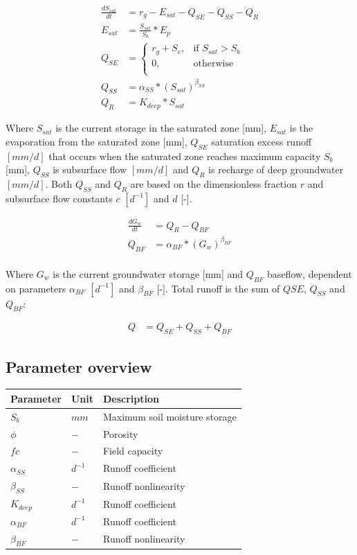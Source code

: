 \begin{align}
	\frac{dS_{sat}}{dt} &= r_g - E_{sat} - Q_{SE} - Q_{SS} - Q_{R}\\
	E_{sat} &= \frac{S_{sat}}{S_b}*E_p\\
	Q_{SE} &= \begin{cases}
		r_g+S_e, &\text{if } S_{sat} > S_b \\
		0, & \text{otherwise} \\
	\end{cases} \\
	Q_{SS} &= \alpha_{SS}*\left(S_{sat}\right)^{\beta_{SS}}\\
	Q_{R} &= K_{deep}*S_{sat}
\end{align}

Where $S_{sat}$ is the current storage in the saturated zone [mm], $E_{sat}$ is the evaporation from the saturated zone [mm], $Q_{SE}$ saturation excess runoff $[mm/d]$ that occurs when the saturated zone reaches maximum capacity $S_b$ [mm], $Q_{SS}$ is subsurface flow $[mm/d]$ and $Q_R$ is recharge of deep groundwater $[mm/d]$. Both $Q_{SS}$ and $Q_R$ are based on the dimensionless fraction $r$ and subsurface flow constants $c$ $[d^{-1}]$ and $d$ [-]. 

\begin{align}
	\frac{dG_w}{dt} &= Q_{R} - Q_{BF}\\
	Q_{BF} &= \alpha_{BF}*\left(G_w\right)^{\beta_{BF}}\\
\end{align}

Where $G_w$ is the current groundwater storage [mm] and $Q_{BF}$ baseflow, dependent on parameters  $\alpha_{BF}$ $[d^{-1}]$ and $\beta_{BF}$ [-]. Total runoff is the sum of $Q{SE}$, $Q_{SS}$ and $Q_{BF}$:

\begin{align}
	Q &= Q_{SE} + Q_{SS} + Q_{BF}
\end{align}

\newpage
\subsection{Parameter overview}
\begin{table}[htbp]
  \centering
    \begin{tabular}{lll}
    \toprule
    Parameter & Unit  & Description \\
    \midrule
    $S_b$ & $mm$  & Maximum soil moisture storage \\
    $\phi$ & $-$   & Porosity \\
    $fc$  & $-$   & Field capacity \\
    $\alpha_{SS}$ & $d^{-1}$ & Runoff coefficient \\
    $\beta_{SS}$ & $-$   & Runoff nonlinearity \\
    $K_{deep}$ & $d^{-1}$ & Runoff coefficient \\
    $\alpha_{BF}$ & $d^{-1}$ & Runoff coefficient \\
    $\beta_{BF}$ & $-$   & Runoff nonlinearity \\
    \bottomrule
    \end{tabular}%
  \label{tab:addlabel}%
\end{table}%


